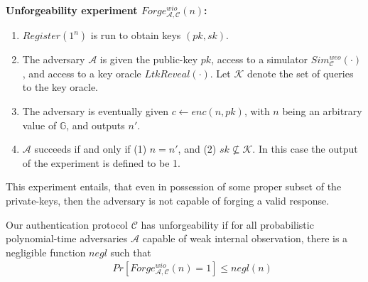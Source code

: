 \vspace{1em}
\noindent\textbf{Unforgeability experiment $Forge^{wio}_{\mathcal{A}, \mathcal{C}}(n)$:}
\begin{enumerate}

    

    
    \item $Register(1^n)$ is run to obtain keys $(pk, sk)$.

    \item The adversary $\mathcal{A}$ is given the public-key $pk$, access to a simulator $Sim^{weo}_\mathcal{C}(\cdot)$, and access to a key oracle $LtkReveal(\cdot)$. Let $\mathcal{K}$ denote the set of queries to the key oracle.
    
    \item The adversary is eventually given $c \leftarrow enc(n,pk)$, with $n$ being an arbitrary value of $\mathbb{G}$, and outputs $n'$.
    
    \item $\mathcal{A}$ succeeds if and only if (1) $n = n'$, and (2) $sk \nsubseteq \mathcal{K}$. In this case the output of the experiment is defined to be 1.
    
\end{enumerate}

This experiment entails, that even in possession of some proper subset of the private-keys, then the adversary is not capable of forging a valid response.

\begin{proposition}\label{conjecture:forge-rev-ex}
Our authentication protocol $\mathcal{C}$ has unforgeability if for all probabilistic polynomial-time adversaries $\mathcal{A}$ capable of weak internal observation, there is a negligible function $negl$ such that
{\setlength{\mathindent}{0cm}
\begin{align*}
&&    Pr\left[ Forge^{wio}_{\mathcal{A}, \mathcal{C}}(n)  = 1 \right] \leq negl(n) 
\end{align*}}
\end{proposition}

